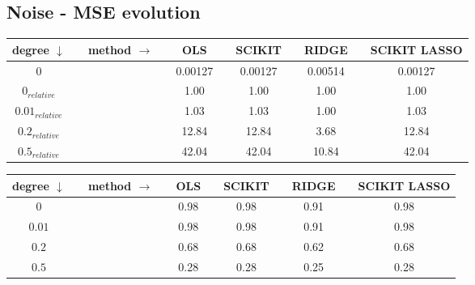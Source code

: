 \subsection{Noise - MSE evolution}

\begin{center}
\label{tab:noise-test}
\begin{tabularx}{\textwidth}{c X c X c X c X c X c}
    \hline
    \hline
        degree $\downarrow$ && method $\rightarrow$ && OLS && SCIKIT && RIDGE && SCIKIT LASSO\\
    \hline
        $0  $               && &&   0.00127     &&	0.00127	  &&	0.00514      && 0.00127		\\
        $0_{relative}$   	&& &&   1.00   	    &&	1.00 	  &&	1.00         &&	1.00	\\
        $0.01_{relative}$   && &&   1.03   	    &&	1.03	  &&	1.00         &&	1.03	\\
        $0.2_{relative}$   	&& &&   12.84   	&&	12.84	  &&	3.68         &&	12.84	\\
        $0.5_{relative}$   	&& &&   42.04   	&&	42.04	  &&	10.84        &&	42.04	\\
    \hline
\end{tabularx}
\end{center}

\begin{center}
\label{tab:noise-test}
\begin{tabularx}{\textwidth}{c X c X c X c X c X c}
    \hline
    \hline
        degree $\downarrow$ && method $\rightarrow$ && OLS && SCIKIT && RIDGE && SCIKIT LASSO\\
    \hline
        $0$   	    && &&   0.98  	&&	0.98	  &&   0.91         &&	0.98    \\
        $0.01$      && &&   0.98  	&&	0.98      &&   0.91         &&	0.98    \\
        $0.2$   	&& &&   0.68   	&&	0.68	  &&   0.62         &&	0.68	\\
        $0.5$   	&& &&   0.28   	&&	0.28	  &&   0.25        &&	0.28	\\
    \hline
\end{tabularx}
\end{center}
